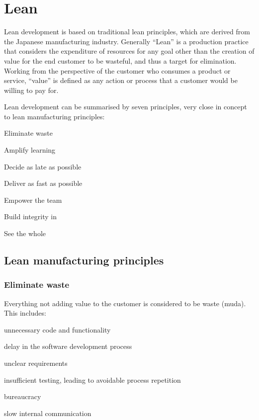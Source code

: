 \section{Lean}

Lean development is based on traditional lean principles, which are derived from the Japanese manufacturing industry. Generally ``Lean'' is a production practice that considers the expenditure of resources for any goal other than the creation of value for the end customer to be wasteful, and thus a target for elimination. Working from the perspective of the customer who consumes a product or service, ``value'' is defined as any action or process that a customer would be willing to pay for.

Lean development can be summarised by seven principles, very close in concept to lean manufacturing principles:
\begin{compactenum}
\item Eliminate waste
\item Amplify learning
\item Decide as late as possible
\item Deliver as fast as possible
\item Empower the team
\item Build integrity in
\item See the whole
\end{compactenum}

\subsection{Lean manufacturing principles}

\subsubsection{Eliminate waste}
Everything not adding value to the customer is considered to be waste (muda). This includes:
\begin{compactenum}
\item unnecessary code and functionality
\item delay in the software development process
\item unclear requirements
\item insufficient testing, leading to avoidable process repetition
\item bureaucracy
\item slow internal communication
\end{compactenum}

